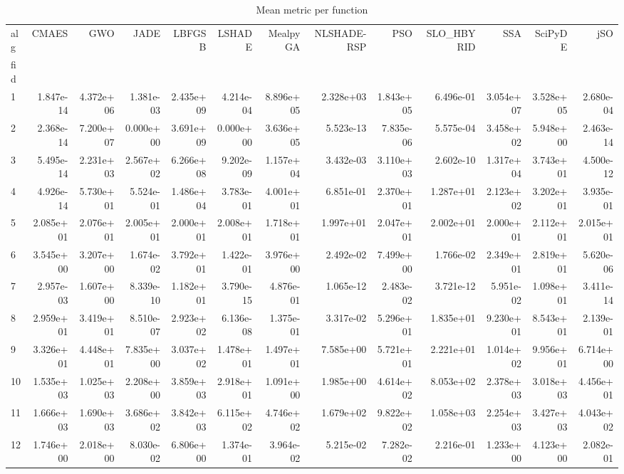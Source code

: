 \begin{table}
\caption{Mean metric per function}
\label{tab:mean_all}
\begin{tabular}{lrrrrrrrrrrrr}
\toprule
alg & CMAES & GWO & JADE & LBFGSB & LSHADE & MealpyGA & NLSHADE-RSP & PSO & SLO_HBYRID & SSA & SciPyDE & jSO \\
fid &  &  &  &  &  &  &  &  &  &  &  &  \\
\midrule
1 & 1.847e-14 & 4.372e+06 & 1.381e-03 & 2.435e+09 & 4.214e-04 & 8.896e+05 & 2.328e+03 & 1.843e+05 & 6.496e-01 & 3.054e+07 & 3.528e+05 & 2.680e-04 \\
2 & 2.368e-14 & 7.200e+07 & 0.000e+00 & 3.691e+09 & 0.000e+00 & 3.636e+05 & 5.523e-13 & 7.835e-06 & 5.575e-04 & 3.458e+02 & 5.948e+00 & 2.463e-14 \\
3 & 5.495e-14 & 2.231e+03 & 2.567e+02 & 6.266e+08 & 9.202e-09 & 1.157e+04 & 3.432e-03 & 3.110e+03 & 2.602e-10 & 1.317e+04 & 3.743e+01 & 4.500e-12 \\
4 & 4.926e-14 & 5.730e+01 & 5.524e-01 & 1.486e+04 & 3.783e-01 & 4.001e+01 & 6.851e-01 & 2.370e+01 & 1.287e+01 & 2.123e+02 & 3.202e+01 & 3.935e-01 \\
5 & 2.085e+01 & 2.076e+01 & 2.005e+01 & 2.000e+01 & 2.008e+01 & 1.718e+01 & 1.997e+01 & 2.047e+01 & 2.002e+01 & 2.000e+01 & 2.112e+01 & 2.015e+01 \\
6 & 3.545e+00 & 3.207e+00 & 1.674e-02 & 3.792e+01 & 1.422e-01 & 3.976e+00 & 2.492e-02 & 7.499e+00 & 1.766e-02 & 2.349e+01 & 2.819e+01 & 5.620e-06 \\
7 & 2.957e-03 & 1.607e+00 & 8.339e-10 & 1.182e+01 & 3.790e-15 & 4.876e-01 & 1.065e-12 & 2.483e-02 & 3.721e-12 & 5.951e-02 & 1.098e+01 & 3.411e-14 \\
8 & 2.959e+01 & 3.419e+01 & 8.510e-07 & 2.923e+02 & 6.136e-08 & 1.375e-01 & 3.317e-02 & 5.296e+01 & 1.835e+01 & 9.230e+01 & 8.543e+01 & 2.139e-01 \\
9 & 3.326e+01 & 4.448e+01 & 7.835e+00 & 3.037e+02 & 1.478e+01 & 1.497e+01 & 7.585e+00 & 5.721e+01 & 2.221e+01 & 1.014e+02 & 9.956e+01 & 6.714e+00 \\
10 & 1.535e+03 & 1.025e+03 & 2.208e+00 & 3.859e+03 & 2.918e+01 & 1.091e+00 & 1.985e+00 & 4.614e+02 & 8.053e+02 & 2.378e+03 & 3.018e+03 & 4.456e+01 \\
11 & 1.666e+03 & 1.690e+03 & 3.686e+02 & 3.842e+03 & 6.115e+02 & 4.746e+02 & 1.679e+02 & 9.822e+02 & 1.058e+03 & 2.254e+03 & 3.427e+03 & 4.043e+02 \\
12 & 1.746e+00 & 2.018e+00 & 8.030e-02 & 6.806e+00 & 1.374e-01 & 3.964e-02 & 5.215e-02 & 7.282e-02 & 2.216e-01 & 1.233e+00 & 4.123e+00 & 2.082e-01 \\

\end{tabular}
\end{table}
